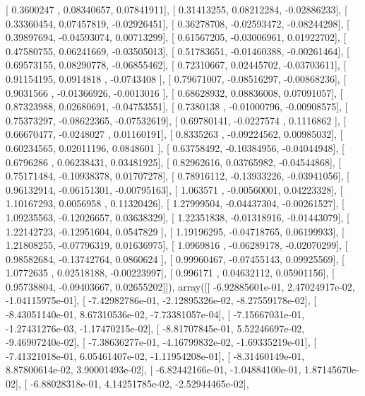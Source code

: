 \documentclass{article}
\begin{document}
       [ 0.3600247 ,  0.08340657,  0.07841911],
       [ 0.31413255,  0.08212284, -0.02886233],
       [ 0.33360454,  0.07457819, -0.02926451],
       [ 0.36278708, -0.02593472, -0.08244298],
       [ 0.39897694, -0.04593074,  0.00713299],
       [ 0.61567205, -0.03006961,  0.01922702],
       [ 0.47580755,  0.06241669, -0.03505013],
       [ 0.51783651, -0.01460388, -0.00261464],
       [ 0.69573155,  0.08290778, -0.06855462],
       [ 0.72310667,  0.02445702, -0.03703611],
       [ 0.91154195,  0.0914818 , -0.0743408 ],
       [ 0.79671007, -0.08516297, -0.00868236],
       [ 0.9031566 , -0.01366926, -0.0013016 ],
       [ 0.68628932,  0.08836008,  0.07091057],
       [ 0.87323988,  0.02680691, -0.04753551],
       [ 0.7380138 , -0.01000796, -0.00908575],
       [ 0.75373297, -0.08622365, -0.07532619],
       [ 0.69780141, -0.0227574 ,  0.1116862 ],
       [ 0.66670477, -0.0248027 ,  0.01160191],
       [ 0.8335263 , -0.09224562,  0.00985032],
       [ 0.60234565,  0.02011196,  0.0848601 ],
       [ 0.63758492, -0.10384956, -0.04044948],
       [ 0.6796286 ,  0.06238431,  0.03481925],
       [ 0.82962616,  0.03765982, -0.04544868],
       [ 0.75171484, -0.10938378,  0.01707278],
       [ 0.78916112, -0.13933226, -0.03941056],
       [ 0.96132914, -0.06151301, -0.00795163],
       [ 1.063571  , -0.00560001,  0.04223328],
       [ 1.10167293,  0.0056958 ,  0.11320426],
       [ 1.27999504, -0.04437304, -0.00261527],
       [ 1.09235563, -0.12026657,  0.03638329],
       [ 1.22351838, -0.01318916, -0.01443079],
       [ 1.22142723, -0.12951604,  0.0547829 ],
       [ 1.19196295, -0.04718765,  0.06199933],
       [ 1.21808255, -0.07796319,  0.01636975],
       [ 1.0969816 , -0.06289178, -0.02070299],
       [ 0.98582684, -0.13742764,  0.0860624 ],
       [ 0.99960467, -0.07455143,  0.09925569],
       [ 1.0772635 ,  0.02518188, -0.00223997],
       [ 0.996171  ,  0.04632112,  0.05901156],
       [ 0.95738804, -0.09403667,  0.02655202]]), array([[ -6.92885601e-01,   2.47024917e-02,  -1.04115975e-01],
       [ -7.42982786e-01,  -2.12895326e-02,  -8.27559178e-02],
       [ -8.43051140e-01,   8.67310536e-02,  -7.73381057e-04],
       [ -7.15667031e-01,  -1.27431276e-03,  -1.17470215e-02],
       [ -8.81707845e-01,   5.52246697e-02,  -9.46907240e-02],
       [ -7.38636277e-01,  -4.16799832e-02,  -1.69335219e-01],
       [ -7.41321018e-01,   6.05461407e-02,  -1.11954208e-01],
       [ -8.31460149e-01,   8.87800614e-02,   3.90001493e-02],
       [ -6.82442166e-01,  -1.04884100e-01,   1.87145670e-02],
       [ -6.88028318e-01,   4.14251785e-02,  -2.52944465e-02],
\end{document}
